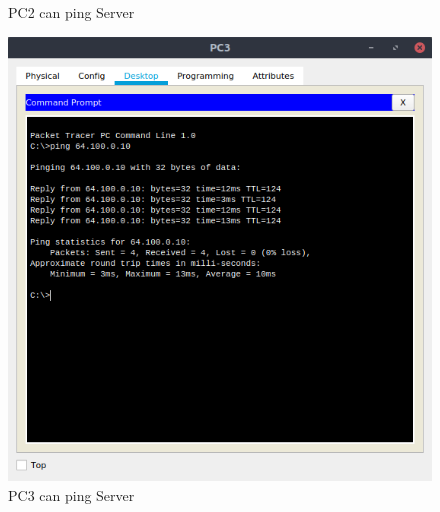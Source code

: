 \documentclass[conference]{IEEEtran}
\begin{document}
\begin{center}
\begin{figure}[h]
\caption{PC2 can ping Server}
\end{figure}
\begin{figure}[h]
\includegraphics[scale=0.45]{../q03c.png}
\caption{PC3 can ping Server}
\end{figure}
\end{center}
\end{document}

